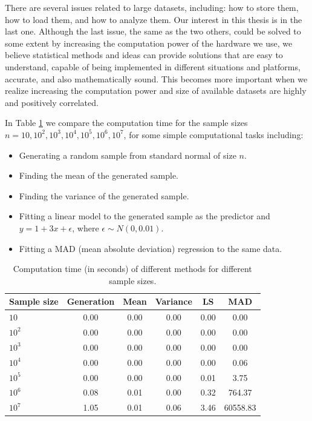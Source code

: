 \documentclass[11pt,a5paper,twoside]{book}
\begin{document}
There are several issues related to large datasets, including: how to store them, how to load them, and how to analyze them. Our interest in this thesis is in the last one. Although the last issue, the same as the two others, could be solved to some extent by increasing the computation power of the hardware we use, we believe statistical methods and ideas can provide solutions that are easy to understand, capable of being implemented in different situations and platforms, accurate, and also mathematically sound. This becomes more important when we realize increasing the computation power and size of available datasets are highly and positively correlated. 



In Table \ref{tab_comptime1} we compare the computation time for the sample sizes $n=10, 10^2, 10^3, 10^4, 10^5, 10^6, 10^7$, for some simple computational tasks including:

\begin{itemize}
\item Generating a random sample from standard normal of size $n$.
\item Finding the mean of the generated sample.
\item Finding the variance of the generated sample.
\item Fitting a linear model to the generated sample as the predictor and $y = 1 + 3x + \epsilon$, where $\epsilon\sim N(0, 0.01)$.
\item Fitting a MAD (mean absolute deviation) regression to the same data.
\end{itemize}



\begin{table}[ht]
\centering
\begin{tabular}{lccccc}
  \hline \hline
Sample size & Generation & Mean & Variance & LS & MAD \\ 
  \hline
 $10$ & 0.00 & 0.00 & 0.00 & 0.00 & 0.00 \\ 
 $10^2$ & 0.00 & 0.00 & 0.00 & 0.00 & 0.00 \\ 
 $10^3$ & 0.00 & 0.00 & 0.00 & 0.00 & 0.00 \\ 
 $10^4$ & 0.00 & 0.00 & 0.00 & 0.00 & 0.06 \\ 
 $10^5$ & 0.00 & 0.00 & 0.00 & 0.01 & 3.75 \\ 
 $10^6$ & 0.08 & 0.01 & 0.00 & 0.32 & 764.37 \\ 
 $10^7$ & 1.05 & 0.01 & 0.06 & 3.46 & 60558.83 \\ 
   \hline \hline
\end{tabular}
\caption{Computation time (in seconds) of different methods for different sample sizes.} 
\label{tab_comptime1}
\end{table}
\end{document}
